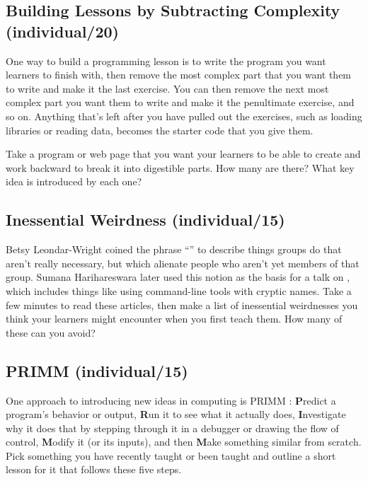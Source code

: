\subsection*{Building Lessons by Subtracting Complexity (individual/20)}

One way to build a programming lesson is
to write the program you want learners to finish with,
then remove the most complex part that you want them to write
and make it the last exercise.
You can then remove the next most complex part you want them to write
and make it the penultimate exercise,
and so on.
Anything that's left after you have pulled out the exercises,
such as loading libraries or reading data,
becomes the starter code that you give them.

Take a program or web page that you want your learners to be able to create
and work backward to break it into digestible parts.
How many are there?
What key idea is introduced by each one?

\subsection*{Inessential Weirdness (individual/15)}

Betsy Leondar-Wright coined the phrase
``''
to describe things groups do
that aren't really necessary,
but which alienate people who aren't yet members of that group.
Sumana Harihareswara later used this notion
as the basis for a talk on
,
which includes things like using command-line tools with cryptic names.
Take a few minutes to read these articles,
then make a list of inessential weirdnesses you think your learners might encounter
when you first teach them.
How many of these can you avoid?

\subsection*{PRIMM (individual/15)}

One approach to introducing new ideas in computing is PRIMM \cite{Sent2019}:
\textbf{P}redict a program's behavior or output,
\textbf{R}un it to see what it actually does,
\textbf{I}nvestigate why it does that by stepping through it in a debugger or drawing the flow of control,
\textbf{M}odify it (or its inputs),
and then \textbf{M}ake something similar from scratch.
Pick something you have recently taught or been taught
and outline a short lesson for it that follows these five steps.

